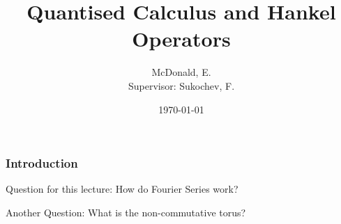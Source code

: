 \documentclass{beamer}
\title[Harmonic Analysis]{Quantised Calculus and Hankel Operators}
\author[McDonald, E.]{McDonald, E. \\Supervisor: Sukochev, F.}
\institute[UNSW] { UNSW Australia }
\date{\today}
\begin{document}
\begin{frame}
\titlepage
\end{frame} %
\begin{frame}
\frametitle{Introduction}
    \begin{block}
            {Question for this lecture:}
                How do Fourier Series work?
        \end{block}
    \begin{block}
            {Another Question:}
                What is the non-commutative torus?
    \end{block}
\end{frame}

\begin{frame}
    
\end{frame}
\end{document}
